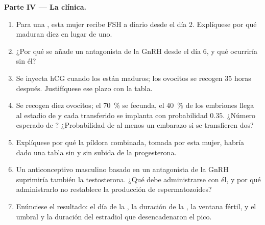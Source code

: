 \begin{problem}
\medskip
\noindent\textbf{Parte IV --- La clínica.}
\begin{enumerate}[resume]
  \item Para una , esta mujer recibe FSH a diario
        desde el día 2. Explíquese por qué maduran diez  en lugar
        de uno.
  \item ¿Por qué se añade un antagonista de la GnRH desde el día 6, y qué
        ocurriría sin él?
  \item Se inyecta hCG cuando los  están maduros; los ovocitos se
        recogen 35 horas después. Justifíquese ese plazo con la tabla.
  \item Se recogen diez ovocitos; el \qty{70}{\%} se fecunda, el
        \qty{40}{\%} de los embriones llega al estadio de  y
        cada  transferido se implanta con probabilidad $0.35$.
        ¿Número esperado de ? ¿Probabilidad de al menos un
        embarazo si se transfieren dos?
  \item Explíquese por qué la píldora combinada, tomada por esta mujer,
        habría dado una tabla sin  y sin subida de la
        progesterona.
  \item Un anticonceptivo masculino basado en un antagonista de la GnRH
        suprimiría también la testosterona. ¿Qué debe administrarse con
        él, y por qué administrarlo no restablece la producción de
        espermatozoides?
  \item Enúnciese el resultado: el día de la , la duración de la
        , la ventana fértil, y el umbral y la duración del
        estradiol que desencadenaron el pico.
\end{enumerate}
\end{problem}
